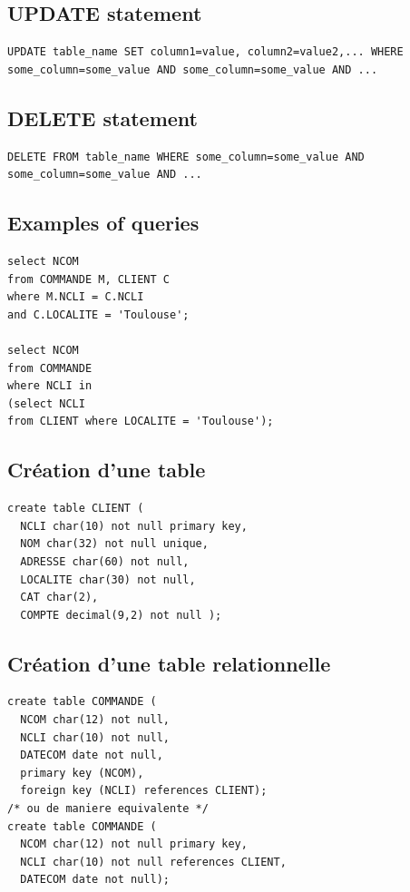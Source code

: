 \subsection{UPDATE statement}
\begin{lstlisting}
UPDATE table_name SET column1=value, column2=value2,... WHERE some_column=some_value AND some_column=some_value AND ...
\end{lstlisting}

\subsection{DELETE statement}
\begin{lstlisting}
DELETE FROM table_name WHERE some_column=some_value AND some_column=some_value AND ...
\end{lstlisting}

\subsection{Examples of queries}
\begin{lstlisting}
select NCOM
from COMMANDE M, CLIENT C
where M.NCLI = C.NCLI
and C.LOCALITE = 'Toulouse';

select NCOM
from COMMANDE
where NCLI in
(select NCLI
from CLIENT where LOCALITE = 'Toulouse');
\end{lstlisting}

\subsection{Création d'une table}
\begin{lstlisting}
create table CLIENT (
  NCLI char(10) not null primary key,
  NOM char(32) not null unique,
  ADRESSE char(60) not null,
  LOCALITE char(30) not null,
  CAT char(2),
  COMPTE decimal(9,2) not null );
\end{lstlisting}

\subsection{Création d'une table relationnelle}
\begin{lstlisting}
create table COMMANDE (
  NCOM char(12) not null,
  NCLI char(10) not null,
  DATECOM date not null,
  primary key (NCOM),
  foreign key (NCLI) references CLIENT);
/* ou de maniere equivalente */
create table COMMANDE (
  NCOM char(12) not null primary key,
  NCLI char(10) not null references CLIENT,
  DATECOM date not null);
\end{lstlisting}

